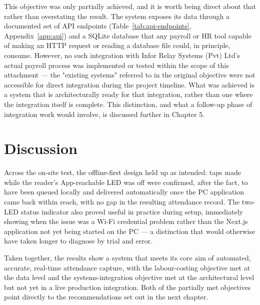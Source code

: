 This objective was only partially achieved, and it is worth being direct about that rather than overstating the result. The system exposes its data through a documented set of API endpoints (Table~\ref{tab:api-endpoints}, Appendix~\ref{app:api}) and a SQLite database that any payroll or HR tool capable of making an HTTP request or reading a database file could, in principle, consume. However, no such integration with Infor Relay Systems (Pvt) Ltd's actual payroll process was implemented or tested within the scope of this attachment — the "existing systems" referred to in the original objective were not accessible for direct integration during the project timeline. What was achieved is a system that is architecturally ready for that integration, rather than one where the integration itself is complete. This distinction, and what a follow-up phase of integration work would involve, is discussed further in Chapter 5.

\section{Discussion}

Across the on-site test, the offline-first design held up as intended: taps made while the reader's App-reachable LED was off were confirmed, after the fact, to have been queued locally and delivered automatically once the PC application came back within reach, with no gap in the resulting attendance record. The two-LED status indicator also proved useful in practice during setup, immediately showing when the issue was a Wi-Fi credential problem rather than the Next.js application not yet being started on the PC — a distinction that would otherwise have taken longer to diagnose by trial and error.

Taken together, the results show a system that meets its core aim of automated, accurate, real-time attendance capture, with the labour-costing objective met at the data level and the systems-integration objective met at the architectural level but not yet in a live production integration. Both of the partially met objectives point directly to the recommendations set out in the next chapter.
